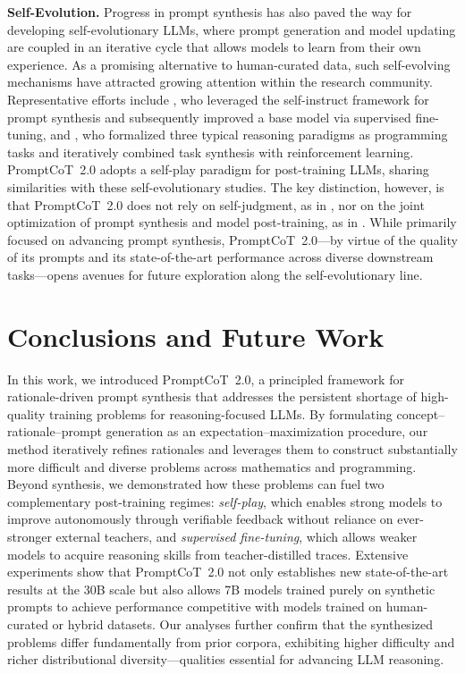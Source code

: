   
  \textbf{Self-Evolution.} Progress in prompt synthesis has also paved the way for developing self-evolutionary LLMs, where prompt generation and model updating are coupled in an iterative cycle that allows models to learn from their own experience. As a promising alternative to human-curated data, such self-evolving mechanisms have attracted growing attention within the research community. Representative efforts include \citet{yuan2024self}, who leveraged the self-instruct framework \citep{wang2023self} for prompt synthesis and subsequently improved a base model via supervised fine-tuning, and \citet{zhao2025absolute}, who formalized three typical reasoning paradigms as programming tasks and iteratively combined task synthesis with reinforcement learning. PromptCoT~2.0 adopts a self-play paradigm for post-training LLMs, sharing similarities with these self-evolutionary studies. The key distinction, however, is that PromptCoT~2.0 does not rely on self-judgment, as in \citet{yuan2024self}, nor on the joint optimization of prompt synthesis and model post-training, as in \citet{zhao2025absolute}. While primarily focused on advancing prompt synthesis, PromptCoT~2.0—by virtue of the quality of its prompts and its state-of-the-art performance across diverse downstream tasks—opens avenues for future exploration along the self-evolutionary line.
  
  
  
  
  \section{Conclusions and Future Work}
  In this work, we introduced PromptCoT~2.0, a principled framework for rationale-driven prompt synthesis that addresses the persistent shortage of high-quality training problems for reasoning-focused LLMs.  
  By formulating concept–rationale–prompt generation as an expectation–maximization procedure, our method iteratively refines rationales and leverages them to construct substantially more difficult and diverse problems across mathematics and programming.  
  Beyond synthesis, we demonstrated how these problems can fuel two complementary post-training regimes: \emph{self-play}, which enables strong models to improve autonomously through verifiable feedback without reliance on ever-stronger external teachers, and \emph{supervised fine-tuning}, which allows weaker models to acquire reasoning skills from teacher-distilled traces.  Extensive experiments show that PromptCoT~2.0 not only establishes new state-of-the-art results at the 30B scale but also allows 7B models trained purely on synthetic prompts to achieve performance competitive with models trained on human-curated or hybrid datasets. 
  Our analyses further confirm that the synthesized problems differ fundamentally from prior corpora, exhibiting higher difficulty and richer distributional diversity—qualities essential for advancing LLM reasoning.  
  

